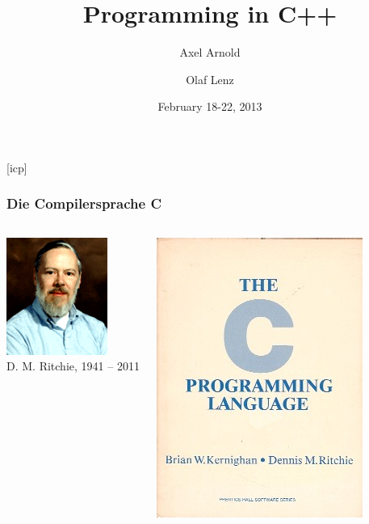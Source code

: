 \documentclass{slides}
\begin{document}
\graphicspath{{figures/}}

\title[Programming in C++]{\Large Programming in C++}

\author[A. Arnold and O. Lenz]{Axel Arnold \and Olaf Lenz} 
\date{February 18-22, 2013}

\begin{frame}
  \titlepage
\end {frame}
[icp]

\begin{frame}
  \frametitle{Die Compilersprache C}

  \begin{columns}[c,onlytextwidth]
    \centering
    \includegraphics[height=0.25\textheight]{ritchie}\\
    {\small D. M. Ritchie, 1941 -- 2011}

    \centering
    \includegraphics[height=0.35\textheight]{kr-c}
  \end{columns}
  \vspace{0.5em}


\end{frame}
\end{document}
